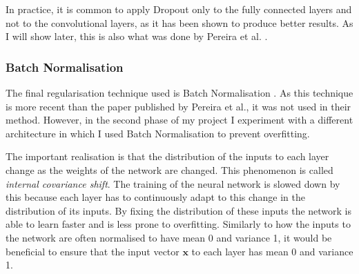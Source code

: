 \documentclass[12pt,a4paper,twoside,openright]{report}
\begin{document}
In practice, it is common to apply Dropout only to the fully connected layers and not to the convolutional layers, as it has been shown to produce better results. As I will show later, this is also what was done by Pereira et al. \cite{pereira}.

\subsubsection{Batch Normalisation}
The final regularisation technique used is Batch Normalisation \cite{batch_normalization}. As this technique is more recent than the paper published by Pereira et al., it was not used in their method. However, in the second phase of my project I experiment with a different architecture in which I used Batch Normalisation to prevent overfitting.

The important realisation is that the distribution of the inputs to each layer change as the weights of the network are changed. This phenomenon is called \textit{internal covariance shift}. The training of the neural network is slowed down by this because each layer has to continuously adapt to this change in the distribution of its inputs. By fixing the distribution of these inputs the network is able to learn faster and is less prone to overfitting. Similarly to how the inputs to the network are often normalised to have mean 0 and variance 1, it would be beneficial to ensure that the input vector $\textbf{x}$ to each layer has mean 0 and variance 1. 
\end{document}
